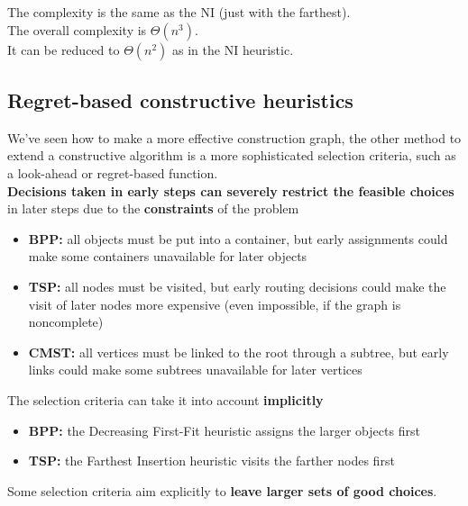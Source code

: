 \documentclass[11pt]{article}
\begin{document}
	The complexity is the same as the NI (just with the farthest).\\
	
	The overall complexity is $\Theta (n^3)$.\\
	
	It can be reduced to $\Theta (n^2)$ as in the NI heuristic.\\
	
	\newpage
	
	\subsection{Regret-based constructive heuristics}
	We've seen how to make a more effective construction graph, the other method to extend a constructive algorithm is a more sophisticated selection criteria, such as a look-ahead or regret-based function.\\
	
	\textbf{Decisions taken in early steps can severely restrict the feasible choices} in later steps due to the \textbf{constraints} of the problem
	\begin{itemize}
		\item \textbf{BPP:} all objects must be put into a container, but early assignments could make some containers unavailable for later objects
		
		\item \textbf{TSP:} all nodes must be visited, but early routing decisions could make the visit of later nodes more expensive (even impossible, if the graph is noncomplete)
		
		\item \textbf{CMST:} all vertices must be linked to the root through a subtree, but early links could make some subtrees unavailable for later vertices
	\end{itemize}
	
	The selection criteria can take it into account \textbf{implicitly}
	\begin{itemize}
		\item \textbf{BPP:} the Decreasing First-Fit heuristic assigns the larger objects first
		\item \textbf{TSP:} the Farthest Insertion heuristic visits the farther nodes first
	\end{itemize}
	
	Some selection criteria aim explicitly to \textbf{leave larger sets of good choices}.\\
	
\end{document}
